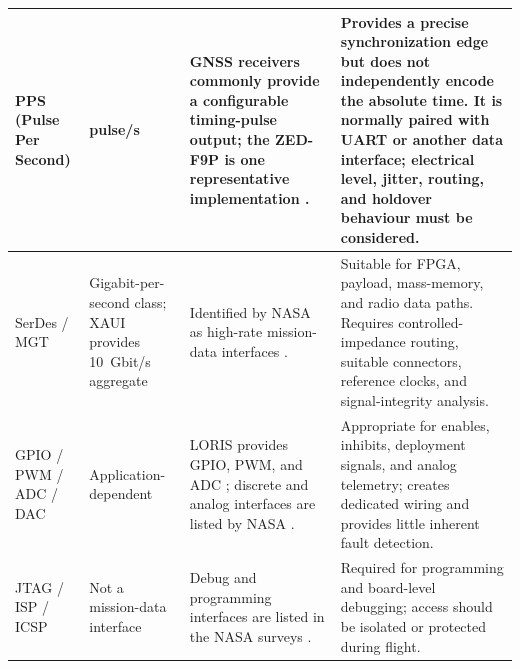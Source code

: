 \documentclass[10pt]{../datasheet}
\let\cite\citep
\begin{document}
\begin{longtable}{|
  >{\raggedright\arraybackslash}p{2.5cm}|
  >{\raggedright\arraybackslash}p{2.5cm}|
  >{\raggedright\arraybackslash}p{5.0cm}|
  >{\raggedright\arraybackslash}p{5.2cm}|}
  PPS (Pulse Per Second)                                               &
  1 pulse/s                                                            &
  GNSS receivers commonly provide a configurable timing-pulse output; the
  ZED-F9P is one representative implementation \cite{ublox_zedf9p_im}. &
  Provides a precise synchronization edge but does not independently encode the
  absolute time. It is normally paired with UART or another data interface;
  electrical level, jitter, routing, and holdover behaviour must be considered.
  \\ \hline

  SerDes / MGT                                                         &
  Gigabit-per-second class; XAUI provides 10~Gbit/s aggregate          &
  Identified by NASA as high-rate mission-data interfaces
  \cite[p.~219]{nasa_soa_2022}
  \cite[p.~235]{nasa_soa_2023}
  \cite[p.~240]{nasa_soa_2024}
  \cite[p.~225]{nasa_soa_2026}.                                        &
  Suitable for FPGA, payload, mass-memory, and radio data paths. Requires
  controlled-impedance routing, suitable connectors, reference clocks, and
  signal-integrity analysis.                                                                 \\ \hline

  GPIO / PWM /
  ADC / DAC                                                            &
  Application-dependent                                                &
  LORIS provides GPIO, PWM, and ADC \cite{loris_obc_pub}; discrete and analog
  interfaces are listed by NASA
  \cite[p.~219]{nasa_soa_2022}
  \cite[p.~235]{nasa_soa_2023}
  \cite[p.~240]{nasa_soa_2024}
  \cite[p.~225]{nasa_soa_2026}.                                        &
  Appropriate for enables, inhibits, deployment signals, and analog telemetry;
  creates dedicated wiring and provides little inherent fault detection.
  \\ \hline

  JTAG / ISP / ICSP                                                    &
  Not a mission-data interface                                         &
  Debug and programming interfaces are listed in the NASA surveys
  \cite[p.~219]{nasa_soa_2022}
  \cite[p.~235]{nasa_soa_2023}
  \cite[p.~240]{nasa_soa_2024}
  \cite[p.~225]{nasa_soa_2026}.                                        &
  Required for programming and board-level debugging; access should be isolated
  or protected during flight.                                                                \\ \hline
\end{longtable}
\end{document}
